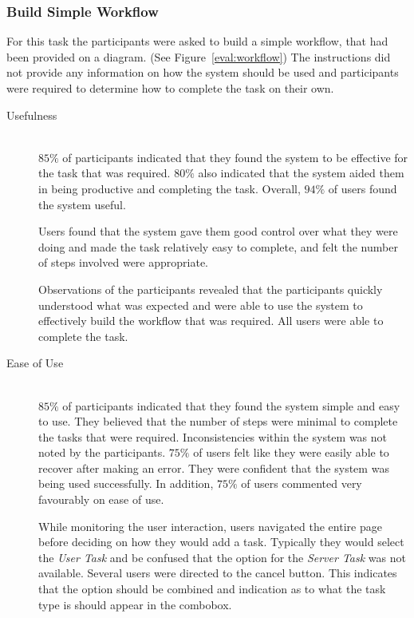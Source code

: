 \subsubsection{Build Simple Workflow\label{eval:simple}}
For this task the participants were asked to build a simple workflow, that had
been provided on a diagram. (See Figure~\ref{eval:workflow}) The instructions
did not provide any information on how the system should be used and
participants were required to determine how to complete the task on their own.
\begin{description}
\item[Usefulness] \hfill \\
    $85\%$ of participants indicated that they found the system to be
    effective for the task that was required. $80\%$ also indicated that
    the system aided them in being productive and completing the task.
    Overall, $94\%$ of users found the system useful.

    Users found that the system gave them good control over what they were doing and
    made the task relatively easy to complete, and felt the number of steps
    involved were appropriate.

    Observations of the participants revealed that the participants quickly
    understood what was expected and were able to use the system to
    effectively build the workflow that was required. All users were able to
    complete the task.
\item[Ease of Use] \hfill \\
    $85\%$ of participants indicated that they found the system simple and easy to use.
    They believed that the number of steps were minimal to complete the tasks
    that were required. Inconsistencies within the system was not noted by
    the participants. $75\%$ of users felt like they were easily able to recover after
    making an error. They were confident that the system was being used
    successfully. In addition, $75\%$ of users commented very favourably on
    ease of use.

    While monitoring the user interaction, users navigated the entire page before
    deciding on how they would add a task. Typically they would select the
    \emph{User Task} and be confused that the option for the \emph{Server Task}
    was  not available. Several users were directed to the cancel button. This
    indicates that the option should be combined and indication as to what the
    task type is should appear in the combobox.


\end{description}

